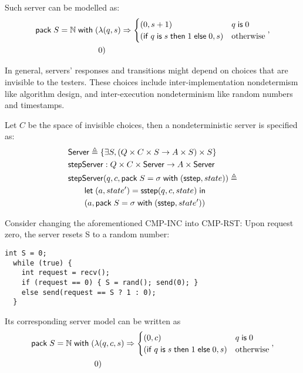 Such server can be modelled as:
\begin{align*}
  \mathsf{pack}\;S=\mathbb N\;\mathsf{with}\;(&\lambda(q,s)\Rightarrow\begin{cases}
        (0,s+1)&q\;\mathsf{is}\;0\\
        (\mathsf{if}\; q\;\mathsf{is}\; s\;\mathsf{then}\;1\;\mathsf{else}\;0,s)&\mathrm{otherwise}
    \end{cases},\\
    &0)
\end{align*}

In general, servers' responses and transitions might depend on choices that are
invisible to the testers.  These choices include inter-implementation
nondetermism like algorithm design, and inter-execution nondeterminism like
random numbers and timestamps.
\begin{definition}
  Let $C$ be the space of invisible choices, then a nondeterministic server is
  specified as:
\begin{align*}
  &\mathsf{Server}\triangleq\{\exists S,(Q \times C \times S \to A \times S) \times S\} \\
  &\mathsf{stepServer}:Q\times C \times \mathsf{Server} \to A\times \mathsf{Server} \\
  &\mathsf{stepServer}(q,c,\mathsf{pack}\;S=\sigma\;\mathsf{with}\;(\mathsf{sstep}, state))\triangleq\\
  &\qquad\mathsf{let}\;(a,state')=\mathsf{sstep}(q,c,state)\;\mathsf{in}\; \\
  &\qquad(a, \mathsf{pack}\;S=\sigma\;\mathsf{with}\;(\mathsf{sstep}, state'))
\end{align*}
\end{definition}

Consider changing the aforementioned CMP-INC into CMP-RST: Upon request zero,
the server resets \inlinec S to a random number:
\begin{lstlisting}[style=customc]
  int S = 0;
  while (true) {
    int request = recv();
    if (request == 0) { S = rand(); send(0); }
    else send(request == S ? 1 : 0);
  }
\end{lstlisting}
Its corresponding server model can be written as
\begin{align*}
  \mathsf{pack}\;S=\mathbb N\;\mathsf{with}\;(&\lambda(q,c,s)\Rightarrow
      \begin{cases}
        (0,c)& q\;\mathsf{is}\;0\\
        (\mathsf{if}\; q\;\mathsf{is}\; s\;\mathsf{then}\; 1\;\mathsf{else}\; 0,s)&\mathrm{otherwise}
      \end{cases}
   ,\\
    &0)
\end{align*}

